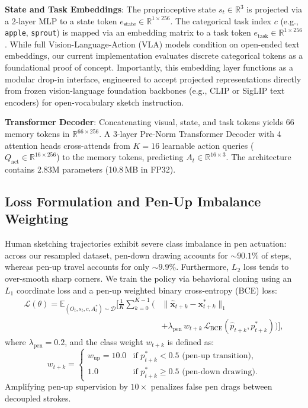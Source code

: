 \documentclass[10pt,twocolumn,letterpaper]{article}
\begin{document}
\noindent\textbf{State and Task Embeddings}: The proprioceptive state $s_t \in \mathbb{R}^3$ is projected via a 2-layer MLP to a state token $e_{\text{state}} \in \mathbb{R}^{1 \times 256}$. The categorical task index $c$ (e.g., \texttt{apple}, \texttt{sprout}) is mapped via an embedding matrix to a task token $e_{\text{task}} \in \mathbb{R}^{1 \times 256}$. While full Vision-Language-Action (VLA) models condition on open-ended text embeddings, our current implementation evaluates discrete categorical tokens as a foundational proof of concept. Importantly, this embedding layer functions as a modular drop-in interface, engineered to accept projected representations directly from frozen vision-language foundation backbones (e.g., CLIP or SigLIP text encoders) for open-vocabulary sketch instruction.

\noindent\textbf{Transformer Decoder}: Concatenating visual, state, and task tokens yields 66 memory tokens in $\mathbb{R}^{66 \times 256}$. A 3-layer Pre-Norm Transformer Decoder with 4 attention heads cross-attends from $K=16$ learnable action queries ($Q_{\text{act}} \in \mathbb{R}^{16 \times 256}$) to the memory tokens, predicting $A_t \in \mathbb{R}^{16 \times 3}$. The architecture contains 2.83M parameters (10.8\,MB in FP32).

\subsection{Loss Formulation and Pen-Up Imbalance Weighting}
Human sketching trajectories exhibit severe class imbalance in pen actuation: across our resampled dataset, pen-down drawing accounts for $\sim 90.1\%$ of steps, whereas pen-up travel accounts for only $\sim 9.9\%$. Furthermore, $L_2$ loss tends to over-smooth sharp corners. We train the policy via behavioral cloning using an $L_1$ coordinate loss and a pen-up weighted binary cross-entropy (BCE) loss:
\begin{align}
  \mathcal{L}(\theta) = \mathbb{E}_{(O_t, s_t, c, A_t^*) \sim \mathcal{D}} \Bigg[ \frac{1}{K} \sum_{k=0}^{K-1} \Big( &\|\hat{\mathbf{x}}_{t+k} - \mathbf{x}_{t+k}^*\|_1 \nonumber\\
  &+ \lambda_{\text{pen}} \, w_{t+k} \, \mathcal{L}_{\text{BCE}}(\hat{p}_{t+k}, p_{t+k}^*) \Big) \Bigg],
\end{align}
where $\lambda_{\text{pen}} = 0.2$, and the class weight $w_{t+k}$ is defined as:
\begin{equation}
  w_{t+k} = \begin{cases}
    w_{\text{up}} = 10.0 & \text{if } p_{t+k}^* < 0.5 \text{ (pen-up transition)}, \\
    1.0 & \text{if } p_{t+k}^* \ge 0.5 \text{ (pen-down drawing)}.
  \end{cases}
\end{equation}
Amplifying pen-up supervision by $10\times$ penalizes false pen drags between decoupled strokes.
\end{document}
